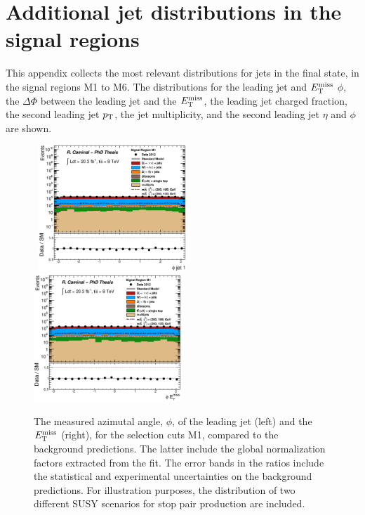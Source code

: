 \chapter{Additional jet distributions in the signal regions}
    \label{app:SRkimenaticDistr}

This appendix collects the most relevant distributions for jets in the final state, in the signal regions M1 to M6.
The distributions for the leading jet and $\met$ $\phi$, the $\Delta\Phi$ between the leading jet and the $\met$, the leading jet charged fraction, the second leading jet $p_{\mathrm{T}}$, the jet multiplicity, and the second leading jet $\eta$ and $\phi$ are shown.

\begin{figure}[!ht]
  \begin{center}
    \mbox{
      \includegraphics[width=0.495\textwidth]{MonojetAnalysis/Figures/plot_Stop_A6_SR_phi1_fitted.eps}
      \includegraphics[width=0.495\textwidth]{MonojetAnalysis/Figures/plot_Stop_A6_SR_met_phi_fitted.eps}
    }
  \end{center}
  \caption[The measured azimutal angle, $\phi$, of the leading jet and the $\met$, for the selection cuts of region M1, after the normalization factors extracted from the fit have been applied.]
{The measured azimutal angle, $\phi$, of the leading jet (left) and the $\met$ (right), for the selection cuts M1, compared to the background predictions. The latter include the global normalization factors extracted from the fit. The error bands in the ratios include the statistical and experimental uncertainties on the background predictions. For illustration purposes, the distribution of two different SUSY scenarios for stop pair production are included.}
  \label{fig:Plot_M1_SR_Jet1_0}
\end{figure}

